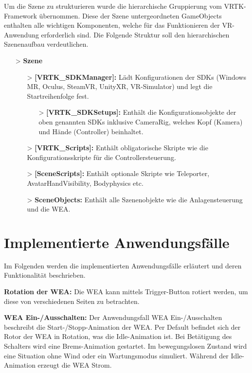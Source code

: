 Um die Szene zu strukturieren wurde die hierarchische Gruppierung vom VRTK-Framework übernommen. Diese der Szene untergeordneten GameObjects enthalten alle wichtigen Komponenten, welche für das Funktionieren der VR-Anwendung erforderlich sind. Die Folgende Struktur soll den hierarchischen Szenenaufbau verdeutlichen.

\begin{itemize}
\item[>] \textbf{Szene} 
	
	\begin{itemize}
	\item[>] \textbf{[VRTK\_SDKManager]:} Lädt Konfigurationen der SDKs (Windows MR, Oculus, SteamVR, UnityXR, VR-Simulator) und legt die Startreihenfolge fest.  	

		\begin{itemize}
			\item[>]\textbf{[VRTK\_SDKSetups]:} Enthält die Konfigurationsobjekte der oben genannten SDKs inklusive CameraRig, welches Kopf (Kamera) und Hände (Controller) beinhaltet.  		
		\end{itemize}
	
	\item[>] \textbf{[VRTK\_Scripts]:} Enthält obligatorische Skripte wie die Konfigurationsskripte für die Controllersteuerung.
					
	\item[>] \textbf{[SceneScripts]:} Enthält optionale Skripte wie Teleporter, AvatarHandVisibility, Bodyphysics etc.
	\item[>] \textbf{SceneObjects:} Enthält alle Szenenobjekte wie die Anlagensteuerung und die WEA.
	\end{itemize}
	
\end{itemize}


\section{Implementierte Anwendungsfälle}
\label{sec:ImplementierteAnwendungsfälle}

Im Folgenden werden die implementierten Anwendungsfälle erläutert und deren Funktionalität beschrieben.

\textbf{Rotation der WEA:} Die WEA kann mittels Trigger-Button rotiert werden, um diese von verschiedenen Seiten zu betrachten. 

\textbf{WEA Ein-/Ausschalten:} Der Anwendungsfall WEA Ein-/Ausschalten beschreibt die Start-/Stopp-Animation der WEA. Per Default befindet sich der Rotor der WEA in Rotation, was die Idle-Animation ist. Bei Betätigung des Schalters wird eine Brems-Animation gestartet. Im bewegungslosen Zustand wird eine Situation ohne Wind oder ein Wartungsmodus simuliert. Während der Idle-Animation erzeugt die WEA Strom.

